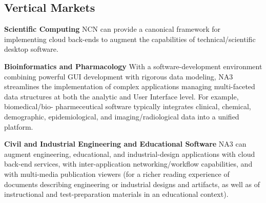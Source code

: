 
\begin{frame}{}
\section{Vertical Markets}

{\thrulex}

{\Large{}\selectfont
\hspace*{5pt}\begin{minipage}{\textwidth}
\vspace{-8pt}



		

{\LARGE \setlength{\leftmargini}{3pt}\begin{enumerate}
\dmitem \textbf{Scientific Computing} \hspace{.5em} 
NCN can provide a canonical framework for 
implementing cloud back-ends to augment 
the capabilities of technical/scientific 
desktop software.
\vspace{16pt}


\dmitem \textbf{Bioinformatics and Pharmacology}  \hspace{.5em} 
With a software-development environment 
combining powerful GUI development with 
rigorous data modeling, NA3 streamlines 
the implementation of complex applications 
managing multi-faceted data structures 
at both the analytic and User Interface 
level.  For example, biomedical/bio- pharmeceutical 
software typically integrates 
clinical, chemical, demographic, epidemiological, 
and imaging/radiological data into a unified 
platform. 
\vspace{16pt}

\dmitem \textbf{Civil and Industrial Engineering and 
Educational Software}  \hspace{.5em} 
NA3 can augment engineering, educational, and 
industrial-design applications with cloud back-end 
services, with inter-application 
networking/workflow capabilities, and with 
multi-media publication viewers (for 
a richer reading experience of documents 
describing engineering or industrial 
designs and artifacts, as well as of 
instructional and test-preparation 
materials in an educational context).


\end{enumerate}}
\end{minipage}}
\end{frame}
